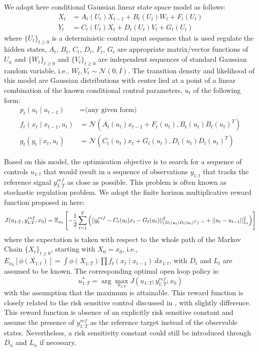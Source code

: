 We adopt here conditional Gaussian linear state space model as follows:
\begin{align}
  X_t &= A_t(U_t)X_{t-1} + B_t(U_t)W_t + F_t(U_t) \nonumber \\
  Y_t &= C_t(U_t)X_t + D_t(U_t)V_t + G_t(U_t)
\label{eq:model}
\end{align}
where $\{U_t\}_{t \geq 0}$ is a deterministic control input sequence that is used regulate the hidden states, $A_t$, $B_t$, $C_t$, $D_t$, $F_t$, $G_t$ are appropriate matrix/vector functions of $U_n$ and  $\{W_t\}_{t \geq 0}$ and  $\{V_t\}_{t \geq 0}$ are independent sequences of standard Gaussian random variable, i.e., $W_t, V_t \sim \mathcal{N}(0,I)$. The transition density and likelihood of this model are Gaussian distributions with center lied at a point of a linear combination of the known conditional control parameters, $u_t$ of the following form:
\begin{align}
  p_t(u_t \mid u_{t-1}) &= \textrm{(any given form)} \nonumber \\
  f_t(x_t \mid x_{t-1}, u_t) &= \mathcal{N}(A_t(u_t) x_{t-1} + F_t(u_t), B_t(u_t)B_t(u_t)^T) \nonumber \\
  g_t(y_t \mid x_t, u_t)    &= \mathcal{N}(C_t(u_t) x_t + G_t(u_t), D_t(u_t)D_t(u_t)^T)
\end{align}

Based on this model, the optimisation objective is to search for a sequence of controls $u_{1:t}$ that would result in a sequence of observations $y_{1:t}$ that tracks the reference signal $y^{ref}_{1:T}$ as close as possible. This problem is often known as stochastic regulation problem. We adopt the finite horizon multiplicative reward function proposed in \cite{NK11} here:
\begin{equation}
  J(u_{1:T},y^{ref}_{1:T}, x_0) = \operatorname{\mathbb{E}}_{x_0}\left[ -\dfrac{1}{2}\displaystyle\sum^T_{t=1}\left(\vert\vert y^{ref}_t - C_t(u_t)x_t - G_t(u_t) \vert\vert^2_{(D_t(u_t)D_t(u_t)^T)^{-1}}  + \vert\vert u_t - u_{t-1} \vert\vert^2_{L_t}\right) \right]
\end{equation}
where the expectation is taken with respect to the whole path of the Markov Chain $\{X_t\}_{t \geq 0}$, starting with $X_0 = x_0$,  i.e., $E_{x_0}[\phi(X_{1:t})] = \displaystyle\int \phi(X_{1:T}) \prod f_t(x_t \mid x_{t-1})~dx_{1:t}$, with $D_t$ and $L_t$ are assumed to be known. The corresponding optimal open loop policy is:
\begin{equation}
  u^*_{1:T} = \arg\max_{u_{1:T}} J(u_{1:T};y^{ref}_{1:T};x_0)
\label{eq:optcontrol}
\end{equation}
with the assumption that the maximum is attainable. This reward function is closely related to the risk sensitive control discussed in \cite{WR90}, with slightly difference. This reward function is absence of an explicitly risk sensitive constant and assume the presence of $y^{ref}_{1:T}$ as the reference target instead of the observable states. Nevertheless, a risk sensitivity constant could still be introduced through $D_n$ and $L_n$ if necessary.

